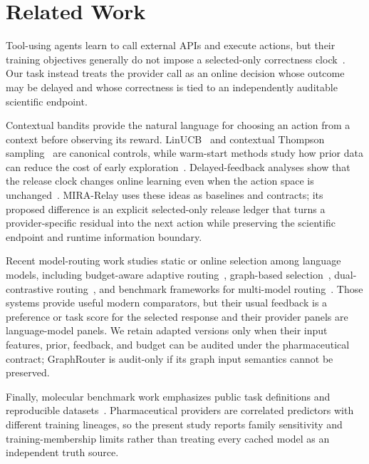 \documentclass[sigconf,anonymous]{aamas}
\begin{document}
\section{Related Work}
Tool-using agents learn to call external APIs and execute actions, but their training objectives generally do not impose a selected-only correctness clock~\cite{schick2023toolformer,yao2023react}. Our task instead treats the provider call as an online decision whose outcome may be delayed and whose correctness is tied to an independently auditable scientific endpoint.

Contextual bandits provide the natural language for choosing an action from a context before observing its reward. LinUCB~\cite{li2010contextual} and contextual Thompson sampling~\cite{agrawal2013thompson} are canonical controls, while warm-start methods study how prior data can reduce the cost of early exploration~\cite{oetomo2023warmstart}. Delayed-feedback analyses show that the release clock changes online learning even when the action space is unchanged~\cite{joulani2013online}. MIRA-Relay uses these ideas as baselines and contracts; its proposed difference is an explicit selected-only release ledger that turns a provider-specific residual into the next action while preserving the scientific endpoint and runtime information boundary.

Recent model-routing work studies static or online selection among language models, including budget-aware adaptive routing~\cite{panda2025pilot}, graph-based selection~\cite{feng2025graphrouter}, dual-contrastive routing~\cite{chen2024routerdc}, and benchmark frameworks for multi-model routing~\cite{hu2024routerbench}. Those systems provide useful modern comparators, but their usual feedback is a preference or task score for the selected response and their provider panels are language-model panels. We retain adapted versions only when their input features, prior, feedback, and budget can be audited under the pharmaceutical contract; GraphRouter is audit-only if its graph input semantics cannot be preserved.

Finally, molecular benchmark work emphasizes public task definitions and reproducible datasets~\cite{huang2021tdc,wu2018moleculenet}. Pharmaceutical providers are correlated predictors with different training lineages, so the present study reports family sensitivity and training-membership limits rather than treating every cached model as an independent truth source.
\end{document}
